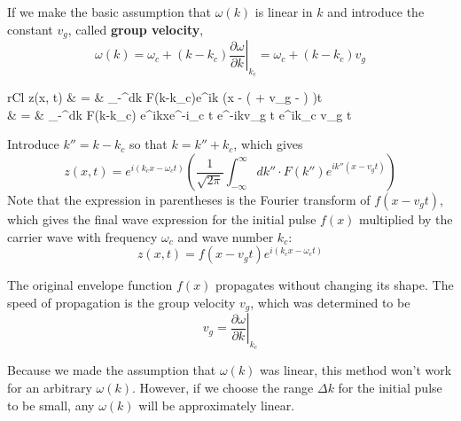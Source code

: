 \documentclass[11pt]{article}
\begin{document}
	If we make the basic assumption that $\omega(k)$ is linear in $k$ and introduce the constant $v_g$, called \textbf{group velocity},
	\begin{equation}
		\omega(k) = \omega_c + (k - k_c) \left.\frac{\partial \omega}{\partial k}\right|_{k_c} = \omega_c + (k - k_c)v_g
	\end{equation}
	\begin{IEEEeqnarray}{rCl}
		z(x, t) & = &  \int_{-\infty}^\infty dk \cdot F(k-k_c)e^{\displaystyle ik \left(x - ( + v_g - ) \right)t}\\
		& = &  \int_{-\infty}^\infty dk \cdot F(k-k_c) e^{ikx}e^{-i\omega_c t} e^{-ikv_g t} e^{ik_c v_g t}
	\end{IEEEeqnarray}
	
	Introduce $k'' = k - k_c$ so that $k = k'' + k_c$, which gives
	\begin{equation}
		z(x, t) = e^{i(k_c x - \omega_c t)} \left( \frac{1}{\sqrt{2\pi}} \int_{-\infty}^\infty dk'' \cdot F(k'')e^{ik''(x - v_g t)} \right)
	\end{equation}
	Note that the expression in parentheses is the Fourier transform of $f(x - v_g t)$, which gives the final wave expression for the initial pulse $f(x)$ multiplied by the carrier wave with frequency $\omega_c$ and wave number $k_c$:
	\begin{equation}
		z(x, t) = f(x - v_g t)e^{i(k_c x - \omega_c t)}
	\end{equation}
	
	The original envelope function $f(x)$ propagates without changing its shape. The speed of propagation is the group velocity $v_g$, which was determined to be
	\begin{equation}
		v_g = \left. \frac{\partial \omega}{\partial k}\right|_{k_c}
	\end{equation}
	
	Because we made the assumption that $\omega(k)$ was linear, this method won't work for an arbitrary $\omega(k)$. However, if we choose the range $\Delta k$ for the initial pulse to be small, any $\omega(k)$ will be approximately linear.

%		
%		


\end{document}

